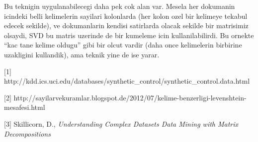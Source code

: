 \documentclass[12pt,fleqn]{article}\usepackage{../common}
\begin{document}
Bu teknigin uygulanabilecegi daha pek cok alan var. Mesela her dokumanin
icindeki belli kelimelerin sayilari kolonlarda (her kolon ozel bir kelimeye
tekabul edecek sekilde), ve dokumanlarin kendisi satirlarda olacak sekilde
bir matrisimiz olsaydi, SVD bu matris uzerinde de bir kumeleme icin
kullanilabilirdi. Bu ornekte ``kac tane kelime oldugu'' gibi bir olcut
vardir (daha once kelimelerin birbirine uzakligini kullandik), ama teknik
yine de ise yarar.

[1] http://kdd.ics.uci.edu/databases/synthetic\_control/synthetic\_control.data.html

[2] http://sayilarvekuramlar.blogspot.de/2012/07/kelime-benzerligi-levenshtein-mesafesi.html

[3] Skillicorn, D., {\em Understanding Complex Datasets Data Mining with Matrix Decompositions}
\end{document}
